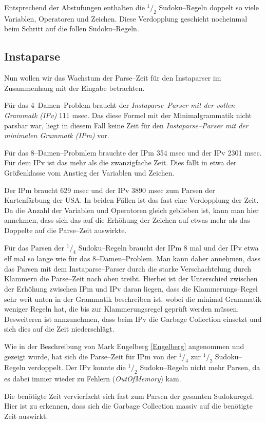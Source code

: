 \documentclass[ngerman,a4paper,abstracton,open=right,twoside=false,toc=listofnumbered,bibtotocnumbered]{scrreprt}
\begin{document}
Entsprechend der Abstufungen enthalten die $^1/_2$ Sudoku--Regeln doppelt so viele Variablen, Operatoren und Zeichen. Diese Verdopplung geschieht nocheinmal beim Schritt auf die follen Sudoku--Regeln.

\subsection{Instaparse}

Nun wollen wir das Wachstum der Parse--Zeit für den Instaparser im Zusammenhang mit der Eingabe betrachten.

Für das 4--Damen--Problem braucht der \emph{Instaparse--Parser mit der vollen Grammatk (IPv)} 111 msec. Das diese Formel mit der Minimalgrammatik nicht parsbar war, liegt in diesem Fall keine Zeit für den \emph{Instaparse--Parser mit der minimalen Grammatk (IPm)} vor.

Für das 8--Damen--Probmlem brauchte der IPm 354 msec und der IPv 2301 msec. Für dem IPv ist das mehr als die zwanzigfache Zeit. Dies fällt in etwa der Größenklasse vom Anstieg der Variablen und Zeichen.

Der IPm braucht 629 msec und der IPv 3890 msec zum Parsen der Kartenfärbung der USA. In beiden Fällen ist das fast eine Verdopplung der Zeit. Da die Anzahl der Variablen und Operatoren gleich geblieben ist, kann man hier annehmen, dass sich das auf die Erhöhung der Zeichen auf etwas mehr als das Doppelte auf die Parse--Zeit auswirkte.

Für das Parsen der $^1/_4$ Sudoku--Regeln braucht der IPm 8 mal und der IPv etwa elf mal so lange wie für das 8--Damen--Problem. Man kann daher annehmen, dass das Parsen mit dem Instaparse--Parser durch die starke Verschachtelung durch Klammern die Parse--Zeit nach oben treibt. Hierbei ist der Unterschied zwischen der Erhöhung zwischen IPm und IPv daran liegen, dass die Klammerungs--Regel sehr weit unten in der Grammatik beschreiben ist, wobei die minimal Grammatik weniger Regeln hat, die bis zur Klammerungsregel geprüft werden müssen. Desweiteren ist annzunehmen, dass beim IPv die Garbage Collection einsetzt und sich dies auf die Zeit niederschlägt.

Wie in der Beschreibung von Mark Engelberg \ref{Engelberg} angenommen und gezeigt wurde, hat sich die Parse--Zeit für IPm von der $^1/_4$ zur $^1/_2$ Sudoku--Regeln verdoppelt. Der IPv konnte die $^1/_2$ Sudoku--Regeln nicht mehr Parsen, da es dabei immer wieder zu Fehlern (\emph{OutOfMemory}) kam.

Die benötigte Zeit vervierfacht sich fast zum Parsen der gesamten Sudokuregel. Hier ist zu erkennen, dass sich die Garbage Collection massiv auf die benötigte Zeit auswirkt.\\
\end{document}
